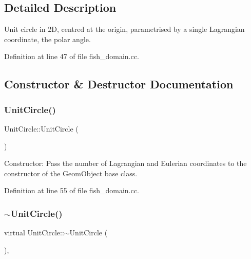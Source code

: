 \subsection{Detailed Description}
Unit circle in 2D, centred at the origin, parametrised by a single Lagrangian coordinate, the polar angle. 

Definition at line 47 of file fish\+\_\+domain.\+cc.



\subsection{Constructor \& Destructor Documentation}
\mbox{\label{classUnitCircle_a494ddf1cb37b659c6f8c44ddde2b9b33}} 
\subsubsection{\texorpdfstring{Unit\+Circle()}{UnitCircle()}}
{\footnotesize\ttfamily Unit\+Circle\+::\+Unit\+Circle (\begin{DoxyParamCaption}{ }\end{DoxyParamCaption})\hspace{0.3cm}{\ttfamily [inline]}}



Constructor\+: Pass the number of Lagrangian and Eulerian coordinates to the constructor of the Geom\+Object base class. 



Definition at line 55 of file fish\+\_\+domain.\+cc.

\mbox{\label{classUnitCircle_a9eb314d8152f5de298e1e155737a69b9}} 
\subsubsection{\texorpdfstring{$\sim$\+Unit\+Circle()}{~UnitCircle()}}
{\footnotesize\ttfamily virtual Unit\+Circle\+::$\sim$\+Unit\+Circle (\begin{DoxyParamCaption}{ }\end{DoxyParamCaption})\hspace{0.3cm}{\ttfamily [inline]}, {\ttfamily [virtual]}}



